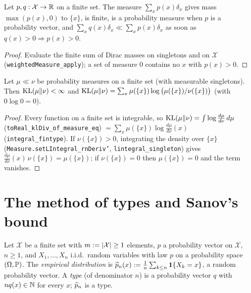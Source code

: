 \begin{lemma}\label{lem:pconc_weighted_measure}
\leanok
Let $p, q : \mathcal X \to \mathbb{R}$ on a finite set. The measure $\sum_x p(x)\delta_x$ gives mass
$\max(p(x), 0)$ to $\{x\}$, is finite, is a probability measure when $p$ is a probability vector,
and $\sum_x q(x)\delta_x \ll \sum_x p(x)\delta_x$ as soon as $q(x) > 0 \Rightarrow p(x) > 0$.
\end{lemma}

\begin{proof}
\leanok
Evaluate the finite sum of Dirac masses on singletons and on $\mathcal X$
(\texttt{weightedMeasure\_apply}); a set of measure $0$ contains no $x$ with $p(x) > 0$.
\end{proof}

\begin{lemma}\label{lem:pconc_kl_finite_sum}
\leanok
Let $\mu \ll \nu$ be probability measures on a finite set (with measurable singletons). Then
$\mathrm{KL}(\mu \| \nu) < \infty$ and $\mathrm{KL}(\mu \| \nu) = \sum_x \mu(\{x\}) \log\big(\mu(\{x\})/\nu(\{x\})\big)$
(with $0 \log 0 = 0$).
\end{lemma}

\begin{proof}
\leanok
Every function on a finite set is integrable, so $\mathrm{KL}(\mu\|\nu) = \int \log\frac{d\mu}{d\nu}\,d\mu$
(\texttt{toReal\_klDiv\_of\_measure\_eq}) $= \sum_x \mu(\{x\}) \log\frac{d\mu}{d\nu}(x)$
(\texttt{integral\_fintype}). If $\nu(\{x\}) > 0$, integrating the density over $\{x\}$
(\texttt{Measure.setLIntegral\_rnDeriv'}, \texttt{lintegral\_singleton}) gives
$\frac{d\mu}{d\nu}(x)\,\nu(\{x\}) = \mu(\{x\})$; if $\nu(\{x\}) = 0$ then $\mu(\{x\}) = 0$ and the term
vanishes.
\end{proof}

\section{The method of types and Sanov's bound}
\label{sec:pconc_sanov}

Let $\mathcal X$ be a finite set with $m := \lvert \mathcal X \rvert \ge 1$ elements, $p$ a probability
vector on $\mathcal X$, $n \ge 1$, and $X_1, \dots, X_n$ i.i.d.\ random variables with law $p$ on
a probability space $(\Omega, \mathbb{P})$. The \emph{empirical distribution} is
$\widehat{p}_n(x) := \frac1n \sum_{k \le n} \mathbf{1}\{X_k = x\}$, a random probability vector. A
\emph{type} (of denominator $n$) is a probability vector $q$ with $n q(x) \in \mathbb{N}$ for every $x$;
$\widehat{p}_n$ is a type.

